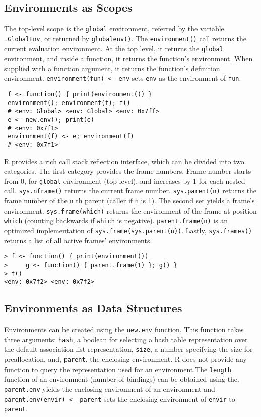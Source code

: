 \documentclass[10pt,review,sigplan,anonymous=true,authorversion=true,nonacm=true]{acmart}
\newcommand{\code}[1]{\lstinline |#1|\xspace}
\newcommand{\newEnv}{\code{new.env}}
\newcommand{\parentEnv}{\code{parent.env}}
\begin{document}
\subsection{Environments as Scopes}
The top-level scope is the \code{global} environment, referred by the variable
\code{.GlobalEnv}, or returned by \code{globalenv()}. The \code{environment()}
call returns the current evaluation environment. At the top level, it returns
the \code{global} environment, and inside a function, it returns the function's
environment. When supplied with a function argument, it returns the function's
definition environment. \code{environment(fun) <- env} sets \code{env} as the
environment of \code{fun}.

\begin{lstlisting}
 f <- function() { print(environment()) }
 environment(); environment(f); f()
 # <env: Global> <env: Global> <env: 0x7ff>
 e <- new.env(); print(e)
 # <env: 0x7f1>
 environment(f) <- e; environment(f)
 # <env: 0x7f1>
\end{lstlisting}

R provides a rich call stack reflection interface, which can be divided into two
categories. The first category provides the frame numbers. Frame number starts
from 0, for \code{global} environment (top level), and increases by 1 for each
nested call. \code{sys.nframe()} returns the current frame number.
\code{sys.parent(n)} returns the frame number of the \code{n}th parent (caller
if \code{n} is 1). The second set yields a frame's environment.
\code{sys.frame(which)} returns the environment of the frame at position
\code{which} (counting backwards if \code{which} is negative).
\code{parent.frame(n)} is an optimized implementation of
\code{sys.frame(sys.parent(n))}. Lastly, \code{sys.frames()} returns a list of
all active frames' environments.

\begin{lstlisting}
> f <- function() { print(environment())
>     g <- function() { parent.frame(1) }; g() }
> f()
<env: 0x7f2> <env: 0x7f2>
\end{lstlisting}

\subsection{Environments as Data Structures}
Environments can be created using the \newEnv function. This function takes
three arguments: \code{hash}, a boolean for selecting a hash table
representation over the default association list representation, \code{size}, a
number specifying the size for preallocation, and, \code{parent}, the enclosing
environment. R does not provide any function to query the representation used
for an environment.The \code{length} function of an environment (number of
bindings) can be obtained using the. \parentEnv yields the enclosing environment
of an environment and \code{parent.env(envir) <- parent} sets the enclosing
environment of \code{envir} to \code{parent}.
\end{document}

